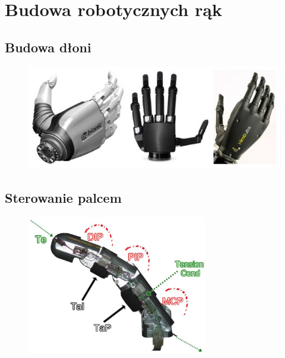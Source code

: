 \documentclass[8pt]{beamer}
\begin{document}
\section{Budowa robotycznych rąk}

	\subsection{Budowa dłoni}
		\begin{frame}
			\begin{center}
				\begin{figure}
					\includegraphics[width=\textwidth]{graphics/three_hand.jpg}
					\label{graph:build}	
					\caption{ \cite{6361492}}
				\end{figure}
			\end{center}
		\end{frame}				

	\subsection{Sterowanie palcem}
		\begin{frame}
			\begin{center}
				\begin{figure}
					\includegraphics[width=0.7\textwidth]{graphics/smarthand_finger.jpg}
					\label{graph:build}	
					\caption{ \cite{6361492}}
				\end{figure}
			\end{center}
		\end{frame}				
\end{document}
